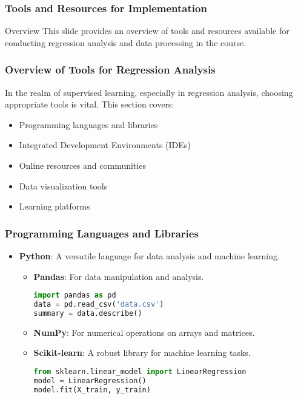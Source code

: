 \documentclass[aspectratio=169]{beamer}
\begin{document}
\begin{frame}
    \frametitle{Tools and Resources for Implementation}
    \begin{block}{Overview}
        This slide provides an overview of tools and resources available for conducting regression analysis and data processing in the course.
    \end{block}
\end{frame}

\begin{frame}[fragile]
    \frametitle{Overview of Tools for Regression Analysis}
    In the realm of supervised learning, especially in regression analysis, choosing appropriate tools is vital. This section covers:
    \begin{itemize}
        \item Programming languages and libraries
        \item Integrated Development Environments (IDEs)
        \item Online resources and communities
        \item Data visualization tools
        \item Learning platforms
    \end{itemize}
\end{frame}

\begin{frame}[fragile]
    \frametitle{Programming Languages and Libraries}
    \begin{itemize}
        \item \textbf{Python}: A versatile language for data analysis and machine learning.
        \begin{itemize}
            \item \textbf{Pandas}: For data manipulation and analysis.
            \begin{lstlisting}[language=Python]
import pandas as pd
data = pd.read_csv('data.csv')
summary = data.describe()
            \end{lstlisting}
            \item \textbf{NumPy}: For numerical operations on arrays and matrices.
            \item \textbf{Scikit-learn}: A robust library for machine learning tasks.
            \begin{lstlisting}[language=Python]
from sklearn.linear_model import LinearRegression
model = LinearRegression()
model.fit(X_train, y_train)
            \end{lstlisting}
        \end{itemize}
    \end{itemize}
\end{frame}
\end{document}
